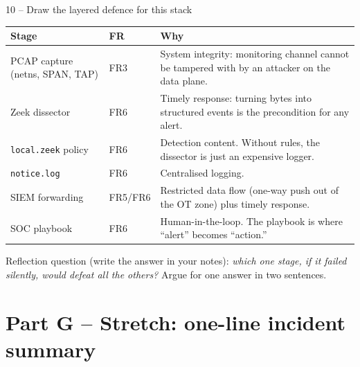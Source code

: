 \documentclass[11pt,a4paper]{article}
\begin{document}
\begin{stepbox}{10 -- Draw the layered defence for this stack}
\renewcommand{\arraystretch}{1.15}
\begin{center}
\begin{tabular}{p{26mm}p{18mm}p{78mm}}
\toprule
\textbf{Stage} & \textbf{FR} & \textbf{Why} \\
\midrule
PCAP capture (netns, SPAN, TAP) & FR3 & System integrity: monitoring channel cannot be tampered with by an attacker on the data plane. \\
Zeek dissector            & FR6 & Timely response: turning bytes into structured events is the precondition for any alert. \\
\texttt{local.zeek} policy & FR6 & Detection content. Without rules, the dissector is just an expensive logger. \\
\texttt{notice.log}        & FR6 & Centralised logging. \\
SIEM forwarding            & FR5/FR6 & Restricted data flow (one-way push out of the OT zone) plus timely response. \\
SOC playbook               & FR6 & Human-in-the-loop. The playbook is where ``alert'' becomes ``action.'' \\
\bottomrule
\end{tabular}
\end{center}

Reflection question (write the answer in your notes): \emph{which one stage, if it failed silently, would defeat all the others?} Argue for one answer in two sentences.
\end{stepbox}

\section*{Part G -- Stretch: one-line incident summary}
\end{document}

